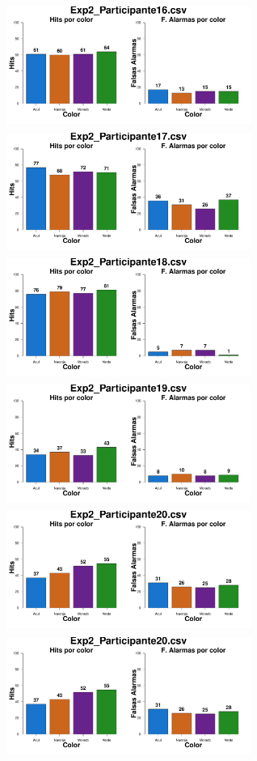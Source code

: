 \documentclass[a4paper ]{article}
\begin{document}
\begin{figure}[th]
\begin{center}
\includegraphics[width=8cm, height=4cm]{Figures/Color_Exp2_P16} \includegraphics[width=8cm, height=4cm]{Figures/Color_Exp2_P17} \includegraphics[width=8cm, height=4cm]{Figures/Color_Exp2_P18}
\includegraphics[width=8cm, height=4cm]{Figures/Color_Exp2_P19} \includegraphics[width=8cm, height=4cm]{Figures/Color_Exp2_P20} \includegraphics[width=8cm, height=4cm]{Figures/Color_Exp2_P20} 
\end{center}
\end{figure}
\end{document}
